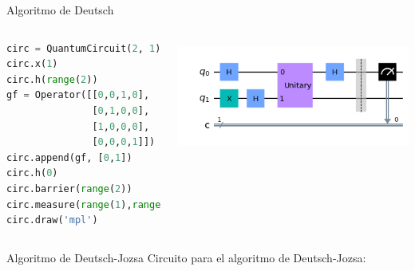 \documentclass[10pt,compress]{beamer}
\begin{document}
\begin{frame}[fragile]{Algoritmo de Deutsch}
\begin{columns}

\begin{lstlisting}[language=Python]
circ = QuantumCircuit(2, 1)
circ.x(1)
circ.h(range(2))
gf = Operator([[0,0,1,0],
               [0,1,0,0],
               [1,0,0,0],
               [0,0,0,1]])
circ.append(gf, [0,1])
circ.h(0)
circ.barrier(range(2))
circ.measure(range(1),range(1))
circ.draw('mpl')
\end{lstlisting}

\begin{center}
\includegraphics[height=10em,width=\hsize]{qc_deutsch}
\end{center}

\end{columns}

\end{frame}

\begin{frame}{Algoritmo de Deutsch-Jozsa}
Circuito para el algoritmo de Deutsch-Jozsa:
\begin{center}
\end{center}

\end{frame}
\end{document}
